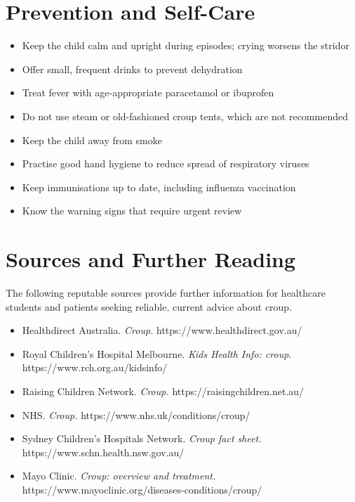 \section*{Prevention and Self-Care}
\begin{itemize}
    \item Keep the child calm and upright during episodes; crying worsens the stridor
    \item Offer small, frequent drinks to prevent dehydration
    \item Treat fever with age-appropriate paracetamol or ibuprofen
    \item Do not use steam or old-fashioned croup tents, which are not recommended
    \item Keep the child away from smoke
    \item Practise good hand hygiene to reduce spread of respiratory viruses
    \item Keep immunisations up to date, including influenza vaccination
    \item Know the warning signs that require urgent review
\end{itemize}

\section*{Sources and Further Reading}
The following reputable sources provide further information for healthcare students and patients seeking reliable, current advice about croup.

\begin{itemize}
    \item Healthdirect Australia. \textit{Croup.} https://www.healthdirect.gov.au/
    \item Royal Children's Hospital Melbourne. \textit{Kids Health Info: croup.} https://www.rch.org.au/kidsinfo/
    \item Raising Children Network. \textit{Croup.} https://raisingchildren.net.au/
    \item NHS. \textit{Croup.} https://www.nhs.uk/conditions/croup/
    \item Sydney Children's Hospitals Network. \textit{Croup fact sheet.} https://www.schn.health.nsw.gov.au/
    \item Mayo Clinic. \textit{Croup: overview and treatment.} https://www.mayoclinic.org/diseases-conditions/croup/
\end{itemize}
